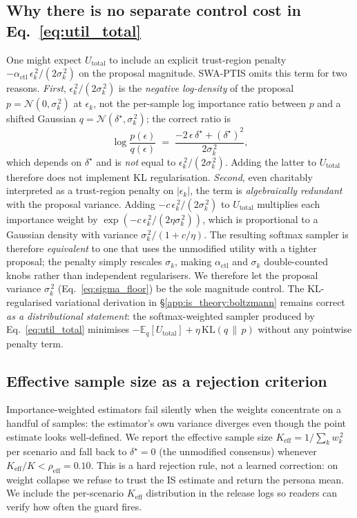 \documentclass{article}
\begin{document}
\subsection{Why there is no separate control cost in Eq.~\ref{eq:util_total}}
\label{app:is_theory:no_ctl}
One might expect $U_{\text{total}}$ to include an explicit trust-region penalty
$-\alpha_{\text{ctl}}\,\epsilon_k^{\,2}/(2\sigma_k^{\,2})$ on the proposal
magnitude. SWA-PTIS omits this term for two reasons.
\emph{First}, $\epsilon_k^{\,2}/(2\sigma_k^{\,2})$ is the \emph{negative
log-density} of the proposal $p=\mathcal{N}(0,\sigma_k^{\,2})$ at $\epsilon_k$,
not the per-sample log importance ratio between $p$ and a shifted Gaussian
$q=\mathcal{N}(\delta^{\star},\sigma_k^{\,2})$; the correct ratio is
\begin{equation}
  \log\frac{p(\epsilon)}{q(\epsilon)}
  \;=\; \frac{-2\,\epsilon\,\delta^{\star} + (\delta^{\star})^{2}}{2\sigma_k^{\,2}},
  \label{eq:correct_log_ratio}
\end{equation}
which depends on $\delta^{\star}$ and is \emph{not} equal to
$\epsilon_k^{\,2}/(2\sigma_k^{\,2})$. Adding the latter to $U_{\text{total}}$
therefore does not implement KL regularisation.
\emph{Second}, even charitably interpreted as a trust-region penalty on
$|\epsilon_k|$, the term is \emph{algebraically redundant} with the proposal
variance. Adding $-c\,\epsilon_k^{\,2}/(2\sigma_k^{\,2})$ to
$U_{\text{total}}$ multiplies each importance weight by
$\exp(-c\,\epsilon_k^{\,2}/(2\eta\sigma_k^{\,2}))$, which is proportional to
a Gaussian density with variance $\sigma_k^{\,2}/(1+c/\eta)$. The resulting
softmax sampler is therefore \emph{equivalent} to one that uses the
unmodified utility with a tighter proposal; the penalty simply rescales
$\sigma_k$, making $\alpha_{\text{ctl}}$ and $\sigma_k$ double-counted knobs
rather than independent regularisers.
We therefore let the proposal variance $\sigma_k^{\,2}$
(Eq.~\ref{eq:sigma_floor}) be the sole magnitude control. The KL-regularised
variational derivation in \S\ref{app:is_theory:boltzmann} remains correct
\emph{as a distributional statement}: the softmax-weighted sampler produced by
Eq.~\ref{eq:util_total} minimises
$-\mathbb{E}_q[U_{\text{total}}]+\eta\,\mathrm{KL}(q\,\|\,p)$
without any pointwise penalty term.

\subsection{Effective sample size as a rejection criterion}
\label{app:is_theory:keff}
Importance-weighted estimators fail silently when the weights concentrate on
a handful of samples: the estimator's own variance diverges even though the
point estimate looks well-defined. We report the effective sample size
$K_{\text{eff}}=1/\sum_k w_k^{\,2}$ per scenario and fall back to
$\delta^{\star}=0$ (the unmodified consensus) whenever
$K_{\text{eff}}/K<\rho_{\text{eff}}=0.10$. This is a hard rejection rule, not
a learned correction: on weight collapse we refuse to trust the IS estimate
and return the persona mean. We include the per-scenario $K_{\text{eff}}$
distribution in the release logs so readers can verify how often the guard
fires.
\end{document}
